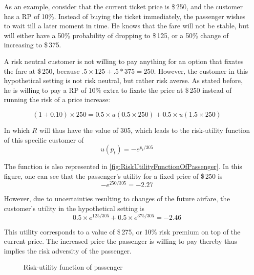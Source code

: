As an example, consider that the current ticket price is \$\,250, and the customer has a $\mbox{RP}$ of 10\%. Instead of buying the ticket immediately, the passenger wishes to wait till a later moment in time. He knows that the fare will not be stable, but will either have a 50\% probability of dropping to \$\,125, or a 50\% change of increasing to \$\,375.

A risk neutral customer is not willing to pay anything for an option that fixates the fare at \$\,250, because $.5 \times 125 + .5 * 375 = 250$. However, the customer in this hypothetical setting is not risk neutral, but rather risk averse. As stated before, he is willing to pay a $\mbox{RP}$ of 10\% extra to fixate the price at \$\,250 instead of running the risk of a price increase:

$$
(1 + 0.10) \times 250 = 0.5 \times u(0.5 \times 250) + 0.5 \times u(1.5 \times 250)
$$

In which $R$ will thus have the value of 305, which leads to the risk-utility function of this specific customer of
$$ u(p_t) = -e^{p_t/305} $$

The function is also represented in \autoref{fig:RiskUtilityFunctionOfPassenger}. In this figure, one can see that the passenger's utility for a fixed price of \$\,250 is
$$ -e^{250/305} = -2.27$$

However, due to uncertainties resulting to changes of the future airfare, the customer's utility in the hypothetical setting is
$$0.5 \times e^{125/305}+0.5 \times e^{375/305} = -2.46$$

This utility corresponds to a value of \$\,275, or 10\% risk premium on top of the current price. The increased price the passenger is willing to pay thereby thus implies the risk adversity of the passenger.

\begin{figure}
    \centering
    \caption{Risk-utility function of passenger}
    \label{fig:RiskUtilityFunctionOfPassenger}
\end{figure}

